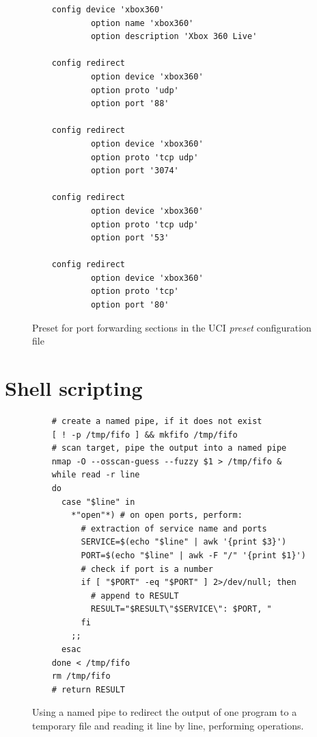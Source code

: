 \documentclass[g5paper,11pt]{kth-bcs}
\begin{document}
   \begin{figure}[ht]
      \centering
      \begin{lstlisting}
    config device 'xbox360'
            option name 'xbox360'
            option description 'Xbox 360 Live'

    config redirect
            option device 'xbox360'
            option proto 'udp'
            option port '88'

    config redirect
            option device 'xbox360'
            option proto 'tcp udp'
            option port '3074'

    config redirect
            option device 'xbox360'
            option proto 'tcp udp'
            option port '53'

    config redirect
            option device 'xbox360'
            option proto 'tcp'
            option port '80'
      \end{lstlisting}
      \caption{
         \small{
Preset for port forwarding sections in the UCI \emph{preset} configuration file
         }
      }
      \label{fig:preset_conf}
   \end{figure}

\chapter{Shell scripting}\label{appB}
   \begin{figure}[ht]
      \centering
      \lstset{language=sh}
      \begin{lstlisting}
    # create a named pipe, if it does not exist
    [ ! -p /tmp/fifo ] && mkfifo /tmp/fifo
    # scan target, pipe the output into a named pipe
    nmap -O --osscan-guess --fuzzy $1 > /tmp/fifo &
    while read -r line
    do
      case "$line" in
        *"open"*) # on open ports, perform:
          # extraction of service name and ports
          SERVICE=$(echo "$line" | awk '{print $3}')
          PORT=$(echo "$line" | awk -F "/" '{print $1}')
          # check if port is a number
          if [ "$PORT" -eq "$PORT" ] 2>/dev/null; then
            # append to RESULT
            RESULT="$RESULT\"$SERVICE\": $PORT, "
          fi
        ;;
      esac
    done < /tmp/fifo
    rm /tmp/fifo
    # return RESULT
      \end{lstlisting}
      \caption{
         \small{
Using a named pipe to redirect the output of one program to a temporary file and reading it line by line, performing operations.
         }
      }
      \label{fig:fifo}
   \end{figure}



\end{document}

